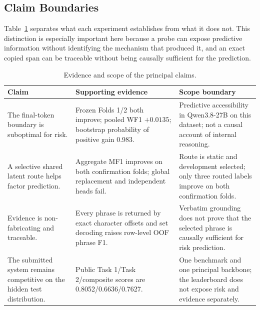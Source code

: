 \documentclass[conference]{IEEEtran}
\begin{document}
\subsection{Claim Boundaries}
Table~\ref{tab:claimscope} separates what each experiment establishes from what it does not. This distinction is especially important here because a probe can expose predictive information without identifying the mechanism that produced it, and an exact copied span can be traceable without being causally sufficient for the prediction.

\begin{table}[t]
\caption{Evidence and scope of the principal claims.}
\label{tab:claimscope}
\centering
\small
\begin{tabular}{@{}p{}p{}p{}@{}}
\toprule
Claim & Supporting evidence & Scope boundary \\
\midrule
The final-token boundary is suboptimal for risk. & Frozen Folds 1/2 both improve; pooled WF1 $+0.0135$; bootstrap probability of positive gain 0.983. & Predictive accessibility in Qwen3.8-27B on this dataset; not a causal account of internal reasoning. \\
A selective shared latent route helps factor prediction. & Aggregate MF1 improves on both confirmation folds; global replacement and independent heads fail. & Route is static and development selected; only three routed labels improve on both confirmation folds. \\
Evidence is non-fabricating and traceable. & Every phrase is returned by exact character offsets and set decoding raises row-level OOF phrase F1. & Verbatim grounding does not prove that the selected phrase is causally sufficient for risk prediction. \\
The submitted system remains competitive on the hidden test distribution. & Public Task 1/Task 2/composite scores are 0.8052/0.6636/0.7627. & One benchmark and one principal backbone; the leaderboard does not expose risk and evidence separately. \\
\bottomrule
\end{tabular}
\end{table}
\end{document}
